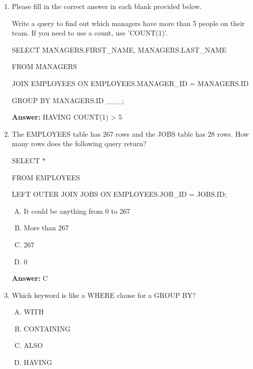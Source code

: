 \documentclass[12pt]{article}
\begin{document}
\begin{enumerate}[1.]
    \item

    Please fill in the correct answer in each blank provided below.

    \bigskip

    Write a query to find out which managers have more than 5 people on their
    team. If you need to use a count, use 'COUNT(1)'.

    \bigskip

    SELECT MANAGERS.FIRST\_NAME, MANAGERS.LAST\_NAME

    FROM MANAGERS

    JOIN EMPLOYEES ON EMPLOYEES.MANAGER\_ID = MANAGERS.ID

    GROUP BY MANAGERS.ID \_\_\_;


    \bigskip

    \textbf{Answer:} HAVING COUNT(1) > 5

    \item

    The EMPLOYEES table has 267 rows and the JOBS table has 28 rows. How many
    rows does the following query return?

    SELECT $\ast$

    FROM EMPLOYEES

    LEFT OUTER JOIN JOBS ON EMPLOYEES.JOB\_ID = JOBS.ID;

    \bigskip

    \begin{enumerate}[A.]
        \item It could be anything from 0 to 267
        \item More than 267
        \item 267
        \item 0
    \end{enumerate}

    \bigskip

    \textbf{Answer:} C

    \item

    Which keyword is like a WHERE clause for a GROUP BY?

    \bigskip

    \begin{enumerate}[A.]
        \item WITH
        \item CONTAINING
        \item ALSO
        \item HAVING
    \end{enumerate}


\end{enumerate}
\end{document}
